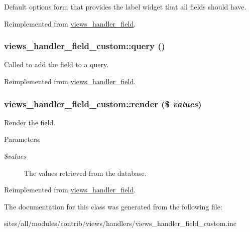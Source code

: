 Default options form that provides the label widget that all fields should have. 

Reimplemented from \hyperlink{classviews__handler__field_0435d161922b7b4b84f02a2e79bb947a}{views\_\-handler\_\-field}.\hypertarget{classviews__handler__field__custom_153c21f3d05ff9f27e345f2c98058bc4}{
\subsubsection[{query}]{\setlength{\rightskip}{0pt plus 5cm}views\_\-handler\_\-field\_\-custom::query ()}}
\label{classviews__handler__field__custom_153c21f3d05ff9f27e345f2c98058bc4}


Called to add the field to a query. 

Reimplemented from \hyperlink{classviews__handler__field_4f661f91bcbe80d4a00c30a31456c502}{views\_\-handler\_\-field}.\hypertarget{classviews__handler__field__custom_0498d3ad0dff40c9e49ec599363c2157}{
\subsubsection[{render}]{\setlength{\rightskip}{0pt plus 5cm}views\_\-handler\_\-field\_\-custom::render (\$ {\em values})}}
\label{classviews__handler__field__custom_0498d3ad0dff40c9e49ec599363c2157}


Render the field.

\begin{Desc}
\item[Parameters:]
\begin{description}
\item[{\em \$values}]The values retrieved from the database. \end{description}
\end{Desc}


Reimplemented from \hyperlink{classviews__handler__field_82ff951c5e9ceb97b2eab86f880cbc1e}{views\_\-handler\_\-field}.

The documentation for this class was generated from the following file:\begin{CompactItemize}
\item 
sites/all/modules/contrib/views/handlers/views\_\-handler\_\-field\_\-custom.inc\end{CompactItemize}
